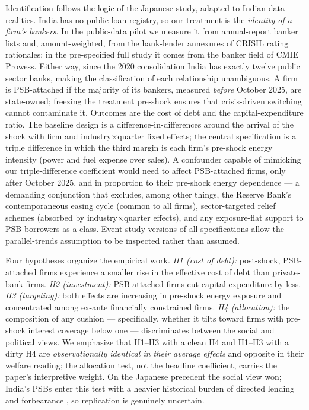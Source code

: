\documentclass[12pt]{article}
\begin{document}
Identification follows the logic of the Japanese study, adapted to Indian data realities.
India has no public loan registry, so our treatment is the \emph{identity of a firm's
bankers}. In the public-data pilot we measure it from annual-report banker lists and,
amount-weighted, from the bank-lender annexures of CRISIL rating rationales; in the
pre-specified full study it comes from the banker field of CMIE Prowess. Either way, since
the 2020 consolidation India has exactly twelve public sector banks, making the
classification of each relationship unambiguous. A firm is PSB-attached if the majority of
its bankers, measured \emph{before} October 2025, are state-owned; freezing the treatment
pre-shock ensures that crisis-driven switching cannot contaminate it. Outcomes are the cost
of debt and the capital-expenditure ratio. The baseline design is a difference-in-differences
around the arrival of the shock with firm and industry$\times$quarter fixed effects; the
central specification is a triple difference in which the third margin is each firm's
pre-shock energy intensity (power and fuel expense over sales). A confounder capable of
mimicking our triple-difference coefficient would need to affect PSB-attached firms, only
after October 2025, and in proportion to their pre-shock energy dependence --- a demanding
conjunction that excludes, among other things, the Reserve Bank's contemporaneous easing
cycle (common to all firms), sector-targeted relief schemes (absorbed by
industry$\times$quarter effects), and any exposure-flat support to PSB borrowers as a class.
Event-study versions of all specifications allow the parallel-trends assumption to be
inspected rather than assumed.

Four hypotheses organize the empirical work. \emph{H1 (cost of debt):} post-shock,
PSB-attached firms experience a smaller rise in the effective cost of debt than private-bank
firms. \emph{H2 (investment):} PSB-attached firms cut capital expenditure by less.
\emph{H3 (targeting):} both effects are increasing in pre-shock energy exposure and
concentrated among ex-ante financially constrained firms. \emph{H4 (allocation):} the
composition of any cushion --- specifically, whether it tilts toward firms with pre-shock
interest coverage below one --- discriminates between the social and political views. We
emphasize that H1--H3 with a clean H4 and H1--H3 with a dirty H4 are \emph{observationally
identical in their average effects} and opposite in their welfare reading; the allocation
test, not the headline coefficient, carries the paper's interpretive weight. On the Japanese
precedent the social view won; India's PSBs enter this test with a heavier historical burden
of directed lending and forbearance \citep{banerjee2014,cole2009}, so replication is
genuinely uncertain.
\end{document}
